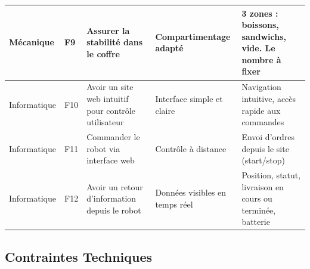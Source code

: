 \documentclass[a4paper,12pt]{report}  %
\begin{document}
{\begin{longtable}{|l|l|p{4cm}|p{4cm}|p{4cm}|}
		\hline
		Mécanique & F9 & Assurer la stabilité dans le coffre & Compartimentage adapté & 3 zones : boissons, sandwichs, vide. Le nombre à fixer \\
		
		\hline
		Informatique & F10 & Avoir un site web intuitif pour contrôle utilisateur & Interface simple et claire & Navigation intuitive, accès rapide aux commandes \\
		
		\hline
		Informatique & F11 & Commander le robot via interface web & Contrôle à distance & Envoi d'ordres depuis le site (start/stop) \\
		
		\hline
		Informatique & F12 & Avoir un retour d'information depuis le robot & Données visibles en temps réel & Position, statut, livraison en cours ou terminée, batterie \\
		
	\end{longtable}
}

\subsection{Contraintes Techniques}
\end{document}
